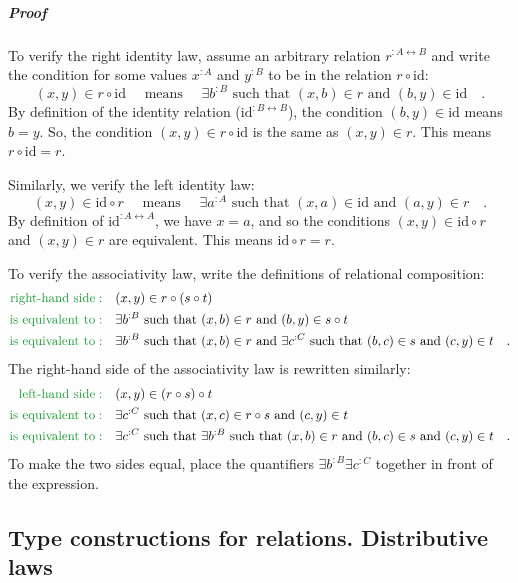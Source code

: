 \subparagraph{Proof}

To verify the right identity law, assume an arbitrary relation $r^{:A\leftrightarrow B}$
and write the condition for some values $x^{:A}$ and $y^{:B}$ to
be in the relation $r\circ\text{id}$:
\[
(x,y)\in r\circ\text{id}\quad\text{ means }\quad\exists b^{:B}\text{ such that }(x,b)\in r\text{ and }(b,y)\in\text{id}\quad.
\]
By definition of the identity relation ($\text{id}^{:B\leftrightarrow B}$),
the condition $(b,y)\in\text{id}$ means $b=y$. So, the condition
$(x,y)\in r\circ\text{id}$ is the same as $(x,y)\in r$. This means
$r\circ\text{id}=r$.

Similarly, we verify the left identity law:
\[
(x,y)\in\text{id}\circ r\quad\text{ means }\quad\exists a^{:A}\text{ such that }(x,a)\in\text{id}\text{ and }(a,y)\in r\quad.
\]
By definition of $\text{id}^{:A\leftrightarrow A}$, we have $x=a$,
and so the conditions $(x,y)\in\text{id}\circ r$ and $(x,y)\in r$
are equivalent. This means $\text{id}\circ r=r$.

To verify the associativity law, write the definitions of relational
composition:
\begin{align*}
{\color{greenunder}\text{right-hand side}:}\quad & (x,y)\in r\circ(s\circ t)\\
{\color{greenunder}\text{is equivalent to}:}\quad & \exists b^{:B}\text{ such that }(x,b)\in r\text{ and }(b,y)\in s\circ t\\
{\color{greenunder}\text{is equivalent to}:}\quad & \exists b^{:B}\text{ such that }(x,b)\in r\text{ and }\exists c^{:C}\text{ such that }(b,c)\in s\text{ and }(c,y)\in t\quad.
\end{align*}
The right-hand side of the associativity law is rewritten similarly:
\begin{align*}
{\color{greenunder}\text{left-hand side}:}\quad & (x,y)\in(r\circ s)\circ t\\
{\color{greenunder}\text{is equivalent to}:}\quad & \exists c^{:C}\text{ such that }(x,c)\in r\circ s\text{ and }(c,y)\in t\\
{\color{greenunder}\text{is equivalent to}:}\quad & \exists c^{:C}\text{ such that }\exists b^{:B}\text{ such that }(x,b)\in r\text{ and }(b,c)\in s\text{ and }(c,y)\in t\quad.
\end{align*}
To make the two sides equal, place the quantifiers $\exists b^{:B}\exists c^{:C}$
together in front of the expression.

\subsection{Type constructions for relations. Distributive laws}

